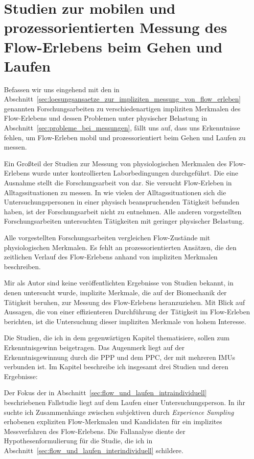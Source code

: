 \chapter{Studien zur mobilen und prozessorientierten Messung des Flow-Erlebens beim Gehen und Laufen}
\label{cha:studien_zur_mobilen_und_prozessorientierten_messung}
Befassen wir uns eingehend mit den in Abschnitt~\ref{sec:loesungsansaetze_zur_impliziten_messung_von_flow_erleben} genannten Forschungsarbeiten zu verschiedenartigen impliziten Merkmalen des Flow-Erlebens und dessen Problemen unter physischer Belastung in Abschnitt~\ref{sec:probleme_bei_messungen}, fällt uns auf, dass uns Erkenntnisse fehlen, um Flow-Erleben mobil und prozessorientiert beim Gehen und Laufen zu messen.

Ein Großteil der Studien zur Messung von physiologischen Merkmalen des Flow-Erlebens wurde unter kontrollierten Laborbedingungen durchgeführt. Die eine Ausnahme stellt die Forschungsarbeit von \citet{Gaggioli2013} dar. Sie versucht Flow-Erleben in Alltagssituationen zu messen. In wie vielen der Alltagssituationen sich die Untersuchungspersonen in einer physisch beanspruchenden Tätigkeit befunden haben, ist der Forschungsarbeit nicht zu entnehmen. Alle anderen vorgestellten Forschungsarbeiten untersuchten Tätigkeiten mit geringer physischer Belastung.

Alle vorgestellten Forschungsarbeiten vergleichen Flow-Zustände mit physiologischen Merkmalen. Es fehlt an prozessorientierten Ansätzen, die den zeitlichen Verlauf des Flow-Erlebens anhand von impliziten Merkmalen beschreiben.

Mir als Autor sind keine veröffentlichten Ergebnisse von Studien bekannt, in denen untersucht wurde, implizite Merkmale, die auf der Biomechanik der Tätigkeit beruhen, zur Messung des Flow-Erlebens heranzuziehen. Mit Blick auf Aussagen, die von einer effizienteren Durchführung der Tätigkeit im Flow-Erleben berichten, ist die Untersuchung dieser impliziten Merkmale von hohem Interesse.

Die Studien, die ich in dem gegenwärtigen Kapitel thematisiere, sollen zum Erkenntnisgewinn beigetragen. Das Augenmerk liegt auf der Erkenntnisgewinnung durch die \ac{PPP} und dem \ac{PPC}, der mit mehreren \acp{IMU} verbunden ist. Im Kapitel beschreibe ich insgesamt drei Studien und deren Ergebnisse:

Der Fokus der in Abschnitt~\ref{sec:flow_und_laufen_intraindividuell} beschriebenen Fallstudie liegt auf dem Laufen einer Untersuchungsperson. In ihr suchte ich Zusammenhänge zwischen subjektiven durch \emph{Experience Sampling} erhobenen expliziten Flow-Merkmalen und Kandidaten für ein implizites Messverfahren des Flow-Erlebens. Die Fallanalyse diente der Hypothesenformulierung für die Studie, die ich in Abschnitt~\ref{sec:flow_und_laufen_interindividuell} schildere.

